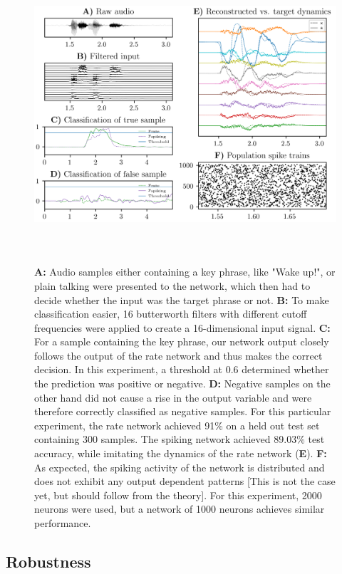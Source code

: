 \documentclass[twoside,11pt,titlepage]{article}
\begin{document}
\begin{figure}[!htb]
  \includegraphics[width = \columnwidth, height=11cm]{figures/figure3.png}
  \caption{\textbf{A:} Audio samples either containing a key phrase, like "Wake up!", or plain talking were
  presented to the network, which then had to decide whether the input was the target phrase or not.
  \textbf{B:} To make classification easier, 16 butterworth filters with different cutoff frequencies
  were applied to create a 16-dimensional input signal. \textbf{C:} For a sample containing the key phrase,
  our network output closely follows the output of the rate network and thus makes the correct decision. In this experiment,
  a threshold at 0.6 determined whether the prediction was positive or negative. \textbf{D:} Negative samples on the other hand
  did not cause a rise in the output variable and were therefore correctly classified as negative samples. For this particular experiment,
  the rate network achieved 91\% on a held out test set containing 300 samples. The spiking network achieved 89.03\% test accuracy,
  while imitating the dynamics of the rate network (\textbf{E}). \textbf{F:} As expected, the spiking activity of the
  network is distributed and does not exhibit any output dependent patterns [This is not the case yet, but should follow from the theory].
  For this experiment, 2000 neurons were used, but a network of 1000 neurons achieves similar performance.}
  \label{fig:figure3}
\end{figure}

\subsection{Robustness}
\end{document}
